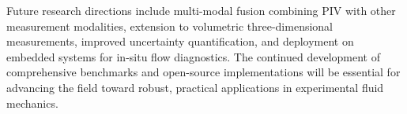 Future research directions include multi-modal fusion combining PIV with other measurement modalities, extension to volumetric three-dimensional measurements, improved uncertainty quantification, and deployment on embedded systems for in-situ flow diagnostics. The continued development of comprehensive benchmarks and open-source implementations will be essential for advancing the field toward robust, practical applications in experimental fluid mechanics.
